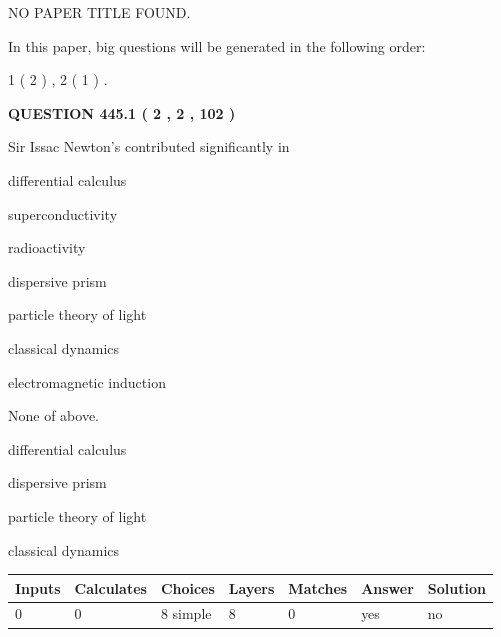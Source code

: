 \documentclass[12pt]{article}
\begin{document}
   
\vspace{0.2in}
   
   
   
   
   
   
 NO PAPER TITLE FOUND.
   
   
   
\vspace{0.2in}
   
In this paper, big questions will be generated in the following order: 
   
   
   1 ( 2 )
 ,
   2 ( 1 )
 .
  
\vspace{0.2in}
  
{\textbf{\Large{QUESTION
445.1 
 ( 2 , 2 , 102 )
}}}
  
  
Sir Issac Newton's contributed significantly in
 
 
differential calculus
 
 
superconductivity
 
 
radioactivity
 
 
dispersive prism
 
 
particle theory of light
 
 
classical dynamics
 
 
electromagnetic induction
 
 
 None of above.
 
 
\noindent{}
 
 
differential calculus
 
 
dispersive prism
 
 
particle theory of light
 
 
classical dynamics
 
 
\noindent{}
 
 
   
   
   
   
\noindent\begin{tabular}{|l|l|l|l|l|l|l|}
 \hline
Inputs & Calculates & Choices & Layers & Matches & Answer & Solution \\ \hline
 0  & 
 0  & 
 8
  simple  
  & 
 8  & 
 0  & 
  yes & 
  no 
  \\ \hline
 \end{tabular}
   
\end{document}
